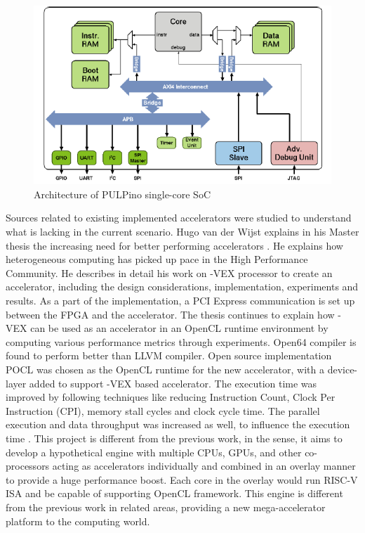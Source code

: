 \begin{figure}[h!]
  \includegraphics[width=\linewidth]{figures/pulpino.PNG}
  \caption{Architecture of PULPino single-core SoC
  \cite{pulpino}}
  \label{fig:pulpino}
\end{figure}
Sources related to existing implemented accelerators were studied to understand what is lacking in the current scenario. Hugo van der Wijst explains in his Master thesis the increasing need for better performing accelerators
\cite{thesis_2015}. He explains how heterogeneous computing has picked up pace in the High Performance Community. He describes in detail his work on \textrho-VEX processor to create an accelerator, including the design considerations, implementation, experiments and results. As a part of the implementation, a PCI Express communication is set up between the FPGA and the accelerator. \newline\newline 
The thesis continues to explain how \textrho-VEX can be used as an accelerator in an OpenCL runtime environment by computing various performance metrics through experiments. Open64 compiler is found to perform better than LLVM compiler. Open source implementation POCL was chosen as the OpenCL runtime for the new accelerator, with a device-layer added to support \textrho-VEX based accelerator. The execution time was improved by following techniques like reducing Instruction Count, Clock Per Instruction (CPI), memory stall cycles and clock cycle time. The parallel execution and data throughput was increased as well, to influence the execution time  \cite{thesis_2015}.\newline\newline
This project is different from the previous work, in the sense, it aims to develop a hypothetical engine with multiple CPUs, GPUs, and other co-processors acting as accelerators individually and combined in an overlay manner to provide a huge performance boost. Each core in the overlay would run RISC-V ISA and be capable of supporting OpenCL framework. This engine is different from the previous work in related areas, providing a new mega-accelerator platform to the computing world.
